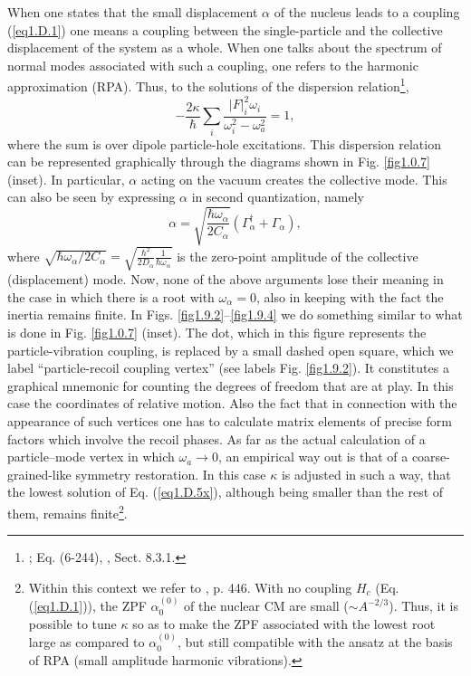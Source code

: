 \begin{subappendices}
When one states that the small displacement 
$\alpha$ of the nucleus leads to a coupling (\ref{eq1.D.1}) one means a coupling between the
single-particle and the collective displacement of the system as a whole. When one talks about the spectrum of normal modes 
associated  with such a coupling, one refers to the harmonic approximation (RPA). Thus, to the solutions of the dispersion relation\footnote{\cite{Bohr:75}; Eq. (6-244), \cite{Brink:05}, Sect. 8.3.1.},
\begin{equation}\label{eq1.D.5x}
- \frac{2 \kappa}{\hbar} \sum_i \frac{|F|_i^2 \omega_i}{\omega_i^2 - \omega_a^2} = 1,
\end{equation}
where the sum is over  dipole particle-hole excitations. This dispersion relation can be represented graphically 
through the diagrams shown in Fig. \ref{fig1.0.7} (inset). In particular, 
$\alpha$ acting on the vacuum creates the collective mode. This can also be seen by expressing $\alpha$ in second quantization, namely
\begin{equation}
\alpha = \sqrt { \frac{\hbar \omega_{\alpha}}{2C_{\alpha}} }
 (\Gamma_{\alpha}^{\dagger} + \Gamma_{\alpha}),
  \end{equation}
  where $\sqrt{ \hbar \omega_{\alpha}/2 C_{\alpha}} = \sqrt{\frac{\hbar^2}{2D_{\alpha} }\frac{1}{\hbar \omega_{\alpha}}}$ is the zero-point amplitude
of the collective (displacement) mode. 
Now, none of the above arguments lose their meaning  in the case in which there is a root with $\omega_{\alpha}= 0$, 
also in keeping  with the fact the  inertia remains finite. 
In Figs. \ref{fig1.9.2}--\ref{fig1.9.4} we do something   similar to what is done in Fig. \ref{fig1.0.7} (inset). The dot, which in this figure represents the particle-vibration coupling, is 
replaced by a small dashed open square, which we  label ``particle-recoil coupling vertex'' (see labels Fig. \ref{fig1.9.2}). It constitutes a graphical mnemonic 
for counting  the degrees of freedom that are at play. In this case the coordinates of relative motion. Also the fact that in connection with the appearance of 
such vertices one has to calculate matrix elements of precise form factors which involve the recoil phases. As far as the actual calculation of a particle--mode vertex in which $\omega_a\rightarrow 0$, an empirical
way out is that of a coarse-grained-like symmetry restoration.
In this case $\kappa$ is adjusted in such a way, that the lowest solution of Eq. (\ref{eq1.D.5x}), although
being smaller than the  rest of them, remains finite\footnote{Within this context we refer to \cite{Bohr:75}, p. 446. With no coupling $H_c$ (Eq. (\ref{eq1.D.1})), the  ZPF $\alpha^{(0)}_0$ of the nuclear CM are small ($\sim A^{-2/3}$). Thus, it is possible to tune $\kappa$ so as to make the ZPF associated with the lowest root large as compared to $\alpha^{(0)}_0$, but still compatible with the ansatz at the basis of RPA (small amplitude harmonic vibrations).}.


\end{subappendices}
